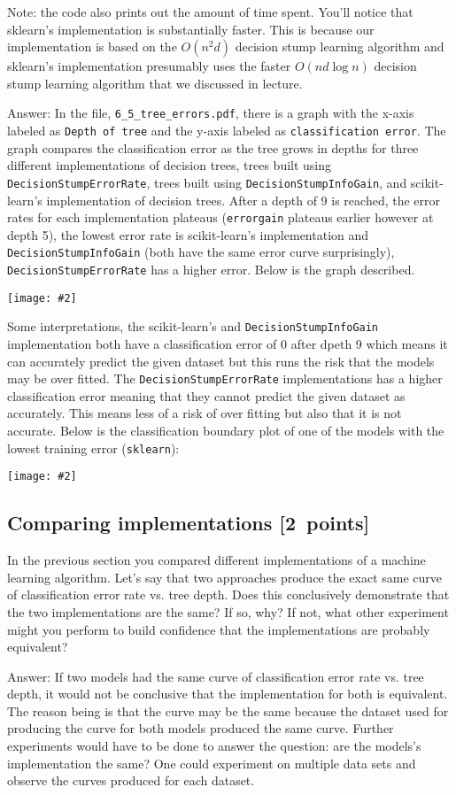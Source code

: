 \documentclass{article}
\newcommand{\gre}[1]{\textcolor{gre}{#1}}
\newcommand\ans[1]{\par\gre{Answer: #1}}
\newcommand\pts[1]{\textcolor{pointscolour}{[#1~points]}}
\newcommand{\centerfig}[2]{\begin{center}\texttt{[image: \#2]}\end{center}}
\begin{document}
  Note: the code also prints out the amount of time spent. You'll notice that sklearn's implementation is substantially faster. This is because
  our implementation is based on the $O(n^2d)$ decision stump learning algorithm and sklearn's implementation presumably uses the faster $O(nd\log n)$
  decision stump learning algorithm that we discussed in lecture.
  \ans{ \newline In the file, \texttt{6\_5\_tree\_errors.pdf}, there is a graph with the x-axis labeled as \texttt{Depth of tree} and the y-axis labeled as \texttt{classification error}. The graph compares the classification error as the tree grows in depths for three different implementations of decision trees, trees built using \texttt{DecisionStumpErrorRate}, trees built using \texttt{DecisionStumpInfoGain}, and scikit-learn's implementation of decision trees. After a depth of 9 is reached, the error rates for each implementation plateaus (\texttt{errorgain} plateaus earlier however at depth 5), the lowest error rate is scikit-learn's implementation and \texttt{DecisionStumpInfoGain} (both have the same error curve surprisingly), \texttt{DecisionStumpErrorRate} has a higher error. Below is the graph described.\centerfig{0.7}{./figs/q6_5_tree_errors}Some interpretations, the scikit-learn's and \texttt{DecisionStumpInfoGain} implementation both have a classification error of 0 after dpeth 9 which means it can accurately predict the given dataset but this runs the risk that the models may be over fitted. The \texttt{DecisionStumpErrorRate} implementations has a higher classification error meaning that they cannot predict the given dataset as accurately. This means less of a risk of over fitting but also that it is not accurate. Below is the classification boundary plot of one of the models with the lowest training error (\texttt{sklearn}):\centerfig{0.7}{./figs/q6_5_decisionBoundary}}

  
  \newpage

  \subsection{Comparing implementations \pts{2}}

  In the previous section you compared different implementations of a machine learning algorithm. Let's say that two
  approaches produce the exact same curve of classification error rate vs. tree depth. Does this conclusively demonstrate
  that the two implementations are the same? If so, why? If not, what other experiment might you perform to build confidence
  that the implementations are probably equivalent?
  
  \ans{  \newline
  If two models had the same curve of classification error rate vs. tree depth, it would not be conclusive that the implementation for both is equivalent. The reason being is that the curve may be the same because the dataset used for producing the curve for both models produced the same curve. Further experiments would have to be done to answer the question: are the models's implementation the same? One could experiment on multiple data sets and observe the curves produced for each dataset.
}
\end{document}
